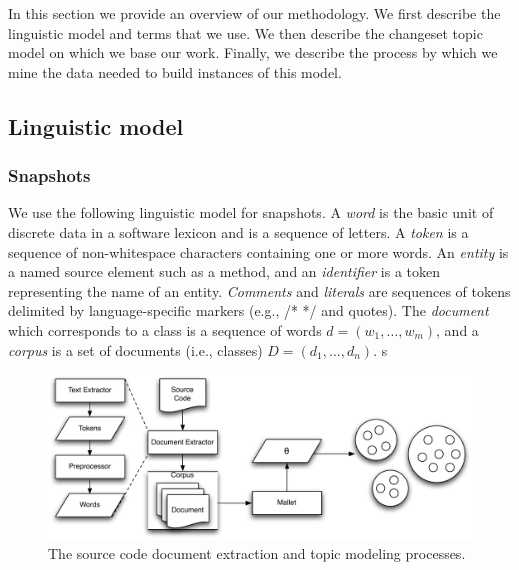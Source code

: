 
In this section we provide an overview of our methodology.
We first describe the linguistic model and terms that we use.
We then describe the changeset topic model on which we base our work.
Finally, we describe the process by which we mine the data
needed to build instances of this model.

\subsection{Linguistic model}
\label{sec:extract}

\subsubsection{Snapshots}

We use the following linguistic model for snapshots.
A \textit{word}
is the basic unit of discrete data in a software lexicon and
is a sequence of letters.
A \textit{token} is a sequence of non-whitespace characters
containing one or more words.
An {\it entity} is a named source element such as a method,
and an \textit{identifier} is a token representing the name of an entity.
\textit{Comments} and \textit{literals} are sequences of tokens
delimited by language-specific markers (e.g., /* */ and quotes).
The \textit{document} which corresponds to a class is a sequence of words $d = (w_1, \ldots, w_m)$,
and a \textit{corpus} is a set of documents (i.e., classes) $D = (d_1, \ldots, d_n)$.
s

\begin{figure}
\vspace{2mm}
\centerline{\includegraphics[width=.8625\textwidth]{Clustering}}
\caption{The source code document extraction and topic modeling processes.}
\label{fig:extract}
\vspace{-2mm}
\end{figure}

